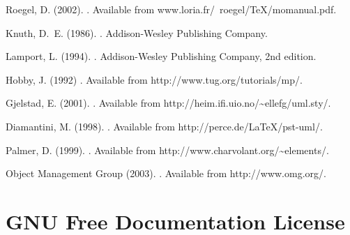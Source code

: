 \documentclass{article}
\newcommand{\code}{\ttfamily}
\begin{document}
\begin{thebibliography}{1}
Roegel, D. (2002).
.
\newblock Available from {\code www.loria.fr/~roegel/TeX/momanual.pdf}.

Knuth, D.~E. (1986).
.
\newblock Addison-Wesley Publishing Company.

Lamport, L. (1994).
.
\newblock Addison-Wesley Publishing Company, 2nd edition.


Hobby, J. (1992)
.
\newblock Available from {\code http://www.tug.org/tutorials/mp/}.

Gjelstad, E. (2001).
.
\newblock Available from {\code http://heim.ifi.uio.no/\~{ }ellefg/uml.sty/}.

Diamantini, M. (1998).
.
\newblock Available from {\code http://perce.de/LaTeX/pst-uml/}.

Palmer, D. (1999).
.
\newblock Available from {\code http://www.charvolant.org/\~{ }elements/}.

Object Management Group (2003).
.
\newblock Available from {\code http://www.omg.org/}.
\end{thebibliography}

\pagebreak
\pagebreak
\pagebreak


\pagebreak
\section{GNU Free Documentation License}

\end{document}
